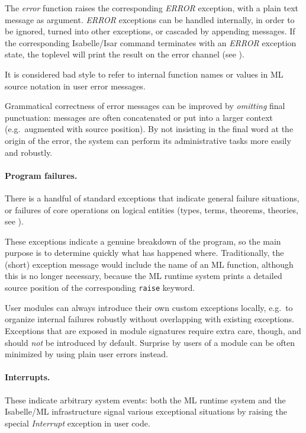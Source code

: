 \begin{isabellebody}
\begin{isamarkuptext}
  The \emph{error} function raises the corresponding \emph{ERROR}
  exception, with a plain text message as argument.  \emph{ERROR}
  exceptions can be handled internally, in order to be ignored, turned
  into other exceptions, or cascaded by appending messages.  If the
  corresponding Isabelle/Isar command terminates with an \emph{ERROR}
  exception state, the toplevel will print the result on the error
  channel (see ).

  It is considered bad style to refer to internal function names or
  values in ML source notation in user error messages.

  Grammatical correctness of error messages can be improved by
  \emph{omitting} final punctuation: messages are often concatenated
  or put into a larger context (e.g.\ augmented with source position).
  By not insisting in the final word at the origin of the error, the
  system can perform its administrative tasks more easily and
  robustly.

  \paragraph{Program failures.}  There is a handful of standard
  exceptions that indicate general failure situations, or failures of
  core operations on logical entities (types, terms, theorems,
  theories, see ).

  These exceptions indicate a genuine breakdown of the program, so the
  main purpose is to determine quickly what has happened where.
  Traditionally, the (short) exception message would include the name
  of an ML function, although this is no longer necessary, because the
  ML runtime system prints a detailed source position of the
  corresponding \verb|raise| keyword.

  \medskip User modules can always introduce their own custom
  exceptions locally, e.g.\ to organize internal failures robustly
  without overlapping with existing exceptions.  Exceptions that are
  exposed in module signatures require extra care, though, and should
  \emph{not} be introduced by default.  Surprise by users of a module
  can be often minimized by using plain user errors instead.

  \paragraph{Interrupts.}  These indicate arbitrary system events:
  both the ML runtime system and the Isabelle/ML infrastructure signal
  various exceptional situations by raising the special
  \emph{Interrupt} exception in user code.


\end{isamarkuptext}
\end{isabellebody}
